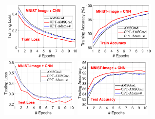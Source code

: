 \documentclass[wcp]{jmlr}
\begin{document}
\begin{figure}[t]
\mbox{\hspace{-0.2in}
\includegraphics[width=1.5in]{new_figure/new_mnist_img_figure/mnist_img_train_loss_disz_2.eps}\hspace{-0.12in}
\includegraphics[width=1.5in]{new_figure/new_mnist_img_figure/mnist_img_train_acc_disz_2.eps}\hspace{-0.12in}
\includegraphics[width=1.5in]{new_figure/mnist_img_test_loss_disz.eps}\hspace{-0.12in}
\includegraphics[width=1.5in]{new_figure/mnist_img_test_acc_disz.eps}
}


\end{figure}
\end{document}

